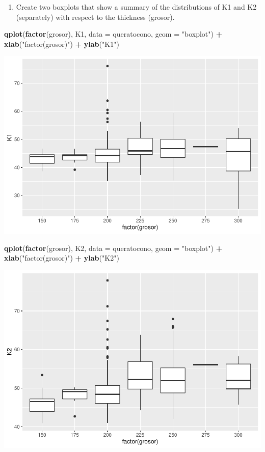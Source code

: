 \documentclass[
]{article}
\newenvironment{Shaded}{\begin{snugshade}}{\end{snugshade}}
\newcommand{\DataTypeTok}[1]{\textcolor[rgb]{0.13,0.29,0.53}{#1}}
\newcommand{\KeywordTok}[1]{\textcolor[rgb]{0.13,0.29,0.53}{\textbf{#1}}}
\newcommand{\NormalTok}[1]{#1}
\newcommand{\OperatorTok}[1]{\textcolor[rgb]{0.81,0.36,0.00}{\textbf{#1}}}
\newcommand{\StringTok}[1]{\textcolor[rgb]{0.31,0.60,0.02}{#1}}
\providecommand{\tightlist}{%
  \setlength{\itemsep}{0pt}\setlength{\parskip}{0pt}}
\begin{document}
\begin{enumerate}
\def\labelenumi{\arabic{enumi}.}
\setcounter{enumi}{5}
\tightlist
\item
  Create two boxplots that show a summary of the distributions of K1 and
  K2 (separately) with respect to the thickness (grosor).
\end{enumerate}

\begin{Shaded}
\begin{Highlighting}[]
\KeywordTok{qplot}\NormalTok{(}\KeywordTok{factor}\NormalTok{(grosor), K1, }\DataTypeTok{data =}\NormalTok{ queratocono, }\DataTypeTok{geom =} \StringTok{"boxplot"}\NormalTok{) }\OperatorTok{+}
\StringTok{  }\KeywordTok{xlab}\NormalTok{(}\StringTok{"factor(grosor)"}\NormalTok{) }\OperatorTok{+}\StringTok{ }\KeywordTok{ylab}\NormalTok{(}\StringTok{"K1"}\NormalTok{)}
\end{Highlighting}
\end{Shaded}

\includegraphics{document_files/figure-latex/unnamed-chunk-8-1.pdf}

\begin{Shaded}
\begin{Highlighting}[]
\KeywordTok{qplot}\NormalTok{(}\KeywordTok{factor}\NormalTok{(grosor), K2, }\DataTypeTok{data =}\NormalTok{ queratocono, }\DataTypeTok{geom =} \StringTok{"boxplot"}\NormalTok{) }\OperatorTok{+}
\StringTok{  }\KeywordTok{xlab}\NormalTok{(}\StringTok{"factor(grosor)"}\NormalTok{) }\OperatorTok{+}\StringTok{ }\KeywordTok{ylab}\NormalTok{(}\StringTok{"K2"}\NormalTok{)}
\end{Highlighting}
\end{Shaded}

\includegraphics{document_files/figure-latex/unnamed-chunk-8-2.pdf}
\end{document}
